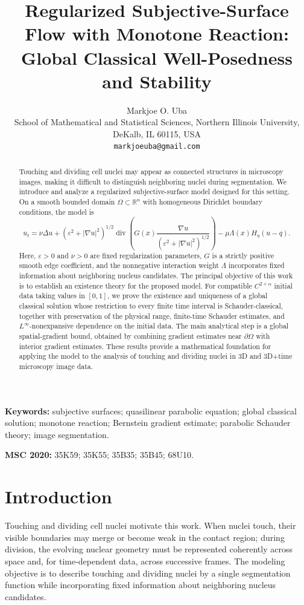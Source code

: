 \documentclass[11pt]{article}
\title{Regularized Subjective-Surface Flow with Monotone Reaction: Global Classical Well-Posedness and Stability}
\author{Markjoe O. Uba\\
\small School of Mathematical and Statistical Sciences, Northern Illinois University, DeKalb, IL 60115, USA\\
\small \texttt{markjoeuba@gmail.com}}
\date{}
\theoremstyle{remark}
\begin{document}
\maketitle

\begin{abstract}
Touching and dividing cell nuclei may appear as connected structures in microscopy images, making it difficult to distinguish neighboring nuclei during segmentation. We introduce and analyze a regularized subjective-surface model designed for this setting. On a smooth bounded domain $\Omega\subset\mathbb{R}^n$ with homogeneous Dirichlet boundary conditions, the model is
\[
u_t
=
\nu\Delta u
+
\left(\varepsilon^2+|\nabla u|^2\right)^{1/2}
\operatorname{div}\!\left(
G(x)\frac{\nabla u}
{\left(\varepsilon^2+|\nabla u|^2\right)^{1/2}}
\right)
-
\mu\Lambda(x)H_\eta(u-q).
\]
Here, $\varepsilon>0$ and $\nu>0$ are fixed regularization parameters, $G$ is a strictly positive smooth edge coefficient, and the nonnegative interaction weight $\Lambda$ incorporates fixed information about neighboring nucleus candidates. The principal objective of this work is to establish an existence theory for the proposed model. For compatible $C^{2+\alpha}$ initial data taking values in $[0,1]$, we prove the existence and uniqueness of a global classical solution whose restriction to every finite time interval is Schauder-classical, together with preservation of the physical range, finite-time Schauder estimates, and $L^\infty$-nonexpansive dependence on the initial data. The main analytical step is a global spatial-gradient bound, obtained by combining gradient estimates near $\partial\Omega$ with interior gradient estimates. These results provide a mathematical foundation for applying the model to the analysis of touching and dividing nuclei in 3D and 3D+time microscopy image data.
\end{abstract}

\noindent\textbf{Keywords:} subjective surfaces; quasilinear parabolic equation; global classical solution; monotone reaction; Bernstein gradient estimate; parabolic Schauder theory; image segmentation.

\noindent\textbf{MSC 2020:} 35K59; 35K55; 35B35; 35B45; 68U10.

\section{Introduction}

Touching and dividing cell nuclei motivate this work. When nuclei touch, their visible boundaries may merge or become weak in the contact region; during division, the evolving nuclear geometry must be represented coherently across space and, for time-dependent data, across successive frames. The modeling objective is to describe touching and dividing nuclei by a single segmentation function while incorporating fixed information about neighboring nucleus candidates.
\end{document}
